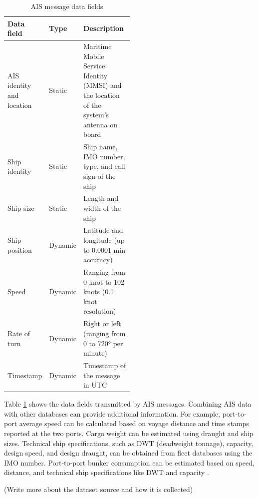 \begin{table}[ht]
    \centering
    \begin{tabular}{|l|l|p{0.5\linewidth}|}
        \hline
        \textbf{Data field}       & \textbf{Type} & \textbf{Description}                                                                      \\
        \hline
        AIS identity and location & Static        & Maritime Mobile Service Identity (MMSI) and the location of the system's antenna on board \\
        \hline
        Ship identity             & Static        & Ship name, IMO number, type, and call sign of the ship                                    \\
        \hline
        Ship size                 & Static        & Length and width of the ship                                                              \\
        \hline
        Ship position             & Dynamic       & Latitude and longitude (up to 0.0001 min accuracy)                                        \\
        \hline
        Speed                     & Dynamic       & Ranging from 0 knot to 102 knots (0.1 knot resolution)                                    \\
        \hline
        Rate of turn              & Dynamic       & Right or left (ranging from 0 to 720° per minute)                                         \\
        \hline
        Timestamp                 & Dynamic       & Timestamp of the message in UTC                                                           \\
        \hline
    \end{tabular}
    \caption{AIS message data fields \autocite{perez2009automatic}}
    \label{tab:ais_message}
\end{table}


Table \ref{tab:ais_message} shows the data fields transmitted by AIS messages.
Combining AIS data with other databases can provide additional information.
For example, port-to-port average speed can be calculated based on voyage distance and time stamps reported at the two ports.
Cargo weight can be estimated using draught and ship sizes. Technical ship specifications, such as DWT (deadweight tonnage), capacity, design speed, and design draught, can be obtained from fleet databases using the IMO number.
Port-to-port bunker consumption can be estimated based on speed, distance, and technical ship specifications like DWT and capacity \autocite{yang2019big}.


(Write more about the dataset source and how it is collected)

